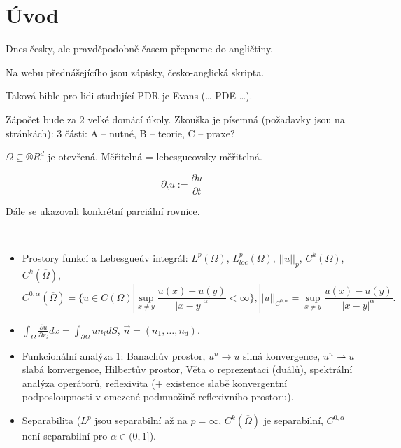 \documentclass[12pt]{article}					%
\begin{document}
\section*{Úvod}
\begin{poznamka}
	Dnes česky, ale pravděpodobně časem přepneme do angličtiny.

	Na webu přednášejícího jsou zápisky, česko-anglická skripta.

	Taková bible pro lidi studující PDR je Evans (… PDE …).

	Zápočet bude za 2 velké domácí úkoly. Zkouška je písemná (požadavky jsou na stránkách): 3 části: A -- nutné, B -- teorie, C -- praxe?
\end{poznamka}

\begin{poznamka}
	$\Omega \subseteq ®R^d$ je otevřená. Měřitelná = lebesgueovsky měřitelná.

	$$ \partial_t u := \frac{\partial u}{\partial t} $$
\end{poznamka}

\begin{poznamka}
	Dále se ukazovali konkrétní parciální rovnice.
\end{poznamka}

\begin{poznamka}
	\ 
	\begin{itemize}
		\item Prostory funkcí a Lebesgueův integrál: $L^p(\Omega)$, $L^p_{loc}(\Omega)$, $||u||_p$, $C^k(\Omega)$, $C^k(\overline{\Omega})$,
			$$ C^{0, \alpha}(\overline{\Omega}) = \{u \in C(\Omega) | \sup_{x ≠ y} \frac{u(x) - u(y)}{|x - y|^{\alpha}} < ∞\}, ||u||_{C^{0, \alpha}} = \sup_{x ≠ y} \frac{u(x) - u(y)}{|x - y|^{\alpha}}. $$
		\item $\int_\Omega \frac{\partial u}{\partial x_i} dx = \int_{\partial \Omega} u n_i dS$, $\vec{n} = (n_1, …, n_d)$.
		\item Funkcionální analýza 1: Banachův prostor, $u^n \rightarrow u$ silná konvergence, $u^n \rightharpoonup u$ slabá konvergence, Hilbertův prostor, Věta o reprezentaci (duálů), spektrální analýza operátorů, reflexivita (+ existence slabě konvergentní podposloupnosti v omezené podmnožině reflexivního prostoru).
		\item Separabilita ($L^p$ jsou separabilní až na $p = ∞$, $C^k(\overline{\Omega})$ je separabilní, $C^{0, \alpha}$ není separabilní pro $\alpha \in (0, 1]$).
	\end{itemize}
\end{poznamka}
\end{document}
